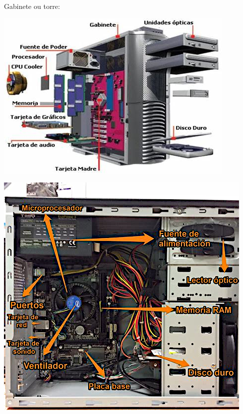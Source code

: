 {{{\begin{multicols}{3}
\vfill
\pagebreak
\end{multicols}

{\large Gabinete ou torre:}
	\begin{center}
		\includegraphics[height=.9\textheight]{./IMG/th-997046030.jpg}
	\end{center}

\vfill
\pagebreak

	\begin{center}
	\includegraphics[height=\textheight]{./IMG/th-1583851518.jpg}
\end{center}

\vfill
\pagebreak

}}}

